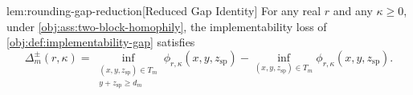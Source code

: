 \begin{lemmav}{lem:rounding-gap-reduction}[Reduced Gap Identity]
For any real $r$ and any $\kappa\ge 0$, under \cref{obj:ass:two-block-homophily}, the implementability loss of \cref{obj:def:implementability-gap} satisfies
\[
\Delta_m^{\pm}(r,\kappa)
=
\inf_{\substack{(x,y,z_{\mathrm{sp}})\in T_m\\ y+z_{\mathrm{sp}}\ge d_m}}
\phi_{r,\kappa}(x,y,z_{\mathrm{sp}})
-
\inf_{(x,y,z_{\mathrm{sp}})\in T_m}
\phi_{r,\kappa}(x,y,z_{\mathrm{sp}}).
\]
\end{lemmav}
